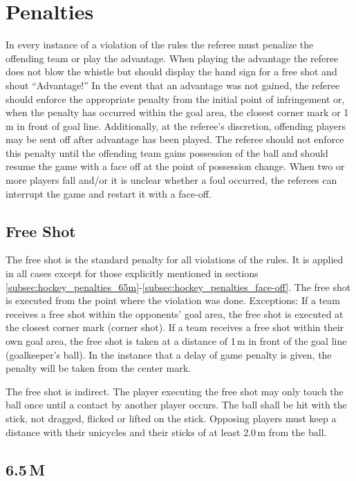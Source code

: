 \section{Penalties}

In every instance of a violation of the rules the referee must penalize the offending team or play the advantage.
When playing the advantage the referee does not blow the whistle but should display the hand sign for a free shot and shout “Advantage!”
In the event that an advantage was not gained, the referee should enforce the appropriate penalty from the initial point of infringement or, when the penalty has occurred within the goal area, the closest corner mark or 1\,m in front of goal line.
Additionally, at the referee's discretion, offending players may be sent off after advantage has been played.
The referee should not enforce this penalty until the offending team gains possession of the ball and should resume the game with a face off at the point of possession change.
When two or more players fall and/or it is unclear whether a foul occurred, the referees can interrupt the game and restart it with a face-off.


\subsection{Free Shot}

The free shot is the standard penalty for all violations of the rules.
It is applied in all cases except for those explicitly mentioned in sections \ref{subsec:hockey_penalties_65m}-\ref{subsec:hockey_penalties_face-off}.
The free shot is executed from the point where the violation was done.
Exceptions: If a team receives a free shot within the opponents' goal area, the free shot is executed at the closest corner mark (corner shot).
If a team receives a free shot within their own goal area, the free shot is taken at a distance of 1\,m in front of the goal line (goalkeeper's ball).
In the instance that a delay of game penalty is given, the penalty will be taken from the center mark.

The free shot is indirect.
The player executing the free shot may only touch the ball once until a contact by another player occurs.
The ball shall be hit with the stick, not dragged, flicked or lifted on the stick.
Opposing players must keep a distance with their unicycles and their sticks of at least 2.0\,m from the ball.

\subsection{6.5\,M \label{subsec:hockey_penalties_65m}}

